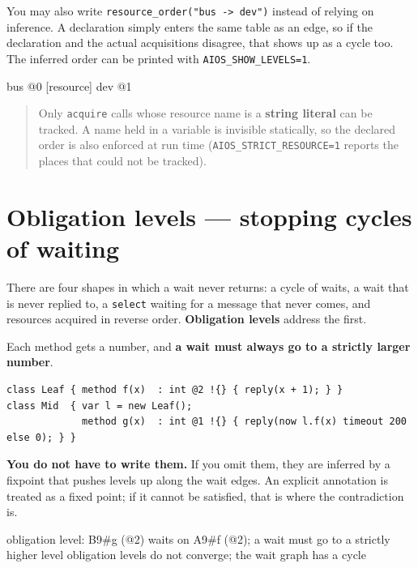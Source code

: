 \documentclass[11pt,a4paper]{article}
\begin{document}
You may also write \texttt{resource\_order("bus -> dev")} instead of relying on
inference. A declaration simply enters the same table as an edge, so if the
declaration and the actual acquisitions disagree, that shows up as a cycle too.
The inferred order can be printed with \texttt{AIOS\_SHOW\_LEVELS=1}.

\begin{term}
[resource] bus                  @0
[resource] dev                  @1
\end{term}

\begin{quote}\small
Only \texttt{acquire} calls whose resource name is a \textbf{string literal}
can be tracked. A name held in a variable is invisible statically, so the
declared order is also enforced at run time
(\texttt{AIOS\_STRICT\_RESOURCE=1} reports the places that could not be tracked).
\end{quote}

\section{Obligation levels --- stopping cycles of waiting}
\label{sec:levels}

There are four shapes in which a wait never returns: a cycle of waits, a wait
that is never replied to, a \texttt{select} waiting for a message that never
comes, and resources acquired in reverse order. \textbf{Obligation levels}
address the first.

Each method gets a number, and \textbf{a wait must always go to a strictly
larger number}.

\begin{lstlisting}
class Leaf { method f(x)  : int @2 !{} { reply(x + 1); } }
class Mid  { var l = new Leaf();
             method g(x)  : int @1 !{} { reply(now l.f(x) timeout 200 else 0); } }
\end{lstlisting}

\textbf{You do not have to write them.} If you omit them, they are inferred by
a fixpoint that pushes levels up along the wait edges. An explicit annotation
is treated as a fixed point; if it cannot be satisfied, that is where the
contradiction is.

\begin{term}
obligation level: B9#g (@2) waits on A9#f (@2);
                  a wait must go to a strictly higher level
obligation levels do not converge; the wait graph has a cycle
\end{term}
\end{document}
